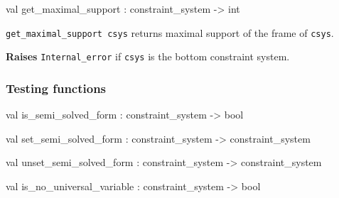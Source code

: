 \label{val:Constraint-underscoresystem.get-underscoremaximal-underscoresupport}\begin{ocamldoccode}
val get_maximal_support : constraint_system -> int
\end{ocamldoccode}
\begin{ocamldocdescription}
{\tt{get\_maximal\_support csys}} returns maximal support of the frame of {\tt{csys}}.

{\bf Raises} {\tt{Internal\_error}} if {\tt{csys}} is the bottom constraint system.


\end{ocamldocdescription}




\subsubsection{Testing functions}




\label{val:Constraint-underscoresystem.is-underscoresemi-underscoresolved-underscoreform}\begin{ocamldoccode}
val is_semi_solved_form : constraint_system -> bool
\end{ocamldoccode}




\label{val:Constraint-underscoresystem.set-underscoresemi-underscoresolved-underscoreform}\begin{ocamldoccode}
val set_semi_solved_form : constraint_system -> constraint_system
\end{ocamldoccode}




\label{val:Constraint-underscoresystem.unset-underscoresemi-underscoresolved-underscoreform}\begin{ocamldoccode}
val unset_semi_solved_form : constraint_system -> constraint_system
\end{ocamldoccode}




\label{val:Constraint-underscoresystem.is-underscoreno-underscoreuniversal-underscorevariable}\begin{ocamldoccode}
val is_no_universal_variable : constraint_system -> bool
\end{ocamldoccode}




